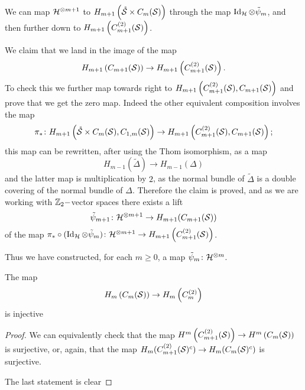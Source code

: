 We can map $\mathcal{H}^{\otimes m+1}$ to $H_{m+1}\left(\mathring{\mathcal{S}}\times C_m(\mathcal{S})\right)$ through the map
$\operatorname{Id}_{\mathcal{H}}\otimes\tilde\psi_m$, and then further down to $H_{m+1}\left(C_{m+1}^{(2)}(\mathcal{S})\right)$.

We claim that
we land in the image of the map
\[
H_{m+1}\left( C_{m+1}(\mathcal{S})\right)\to H_{m+1}\left(C_{m+1}^{(2)}(\mathcal{S})\right).
\]
To check this we further
map towards right to $H_{m+1}\left(C_{m+1}^{(2)}(\mathcal{S}),C_{m+1}(\mathcal{S})\right)$ and prove that we get the zero map.
Indeed the other equivalent composition
involves the map
\[
\pi_*\colon H_{m+1}\left(\mathring{\mathcal{S}}\times C_m(\mathcal{S}), C_{1,m}(\mathcal{S})\right)\to H_{m+1}\left(C_{m+1}^{(2)}(\mathcal{S}),C_{m+1}(\mathcal{S})\right);
\]
this map can be rewritten, after using the Thom isomorphism, as a map
\[
 H_{m-1}(\tilde\Delta)\to H_{m-1}(\Delta)
\]
and the latter map is multiplication by $2$, as the normal bundle of $\tilde\Delta$ is a
double covering of the normal bundle of $\Delta$. Therefore the claim is proved, and
as we are working with $\mathbb{Z}_2-$vector spaces there exists a lift
\[
 \tilde\psi_{m+1}\colon\mathcal{H}^{\otimes m+1}\to H_{m+1}(C_{m+1}(\mathcal{S}))
\]
of the map $\pi_*\circ(\operatorname{Id}_{\mathcal{H}}\otimes\tilde\psi_m)\colon \mathcal{H}^{\otimes m+1}\to H_{m+1}\left(C_{m+1}^{(2)}(\mathcal{S})\right)$.

Thus we have constructed, for each $m\geq 0$, a map $\tilde\psi_m\colon \mathcal{H}^{\otimes m}$.



\begin{lem}
 \label{lem:cmstocmstwoinjective}
 The map
 \[
H_m\left(C_m(\mathcal{S})\right)\to H_m\left(C_m^{(2)}\right)
\]
is injective
 \end{lem}
 \begin{proof}
  We can equivalently check that the map $H^m\left(C_{m+1}^{(2)}(\mathcal{S})\right)\to H^m\left(C_m(\mathcal{S})\right)$ is surjective,
  or, again, that the map $H_m(C_{m+1}^{(2)}(\mathcal{S})^c)\to H_m(C_m(\mathcal{S})^c)$ is surjective.
  
  The last statement is clear
 \end{proof}

